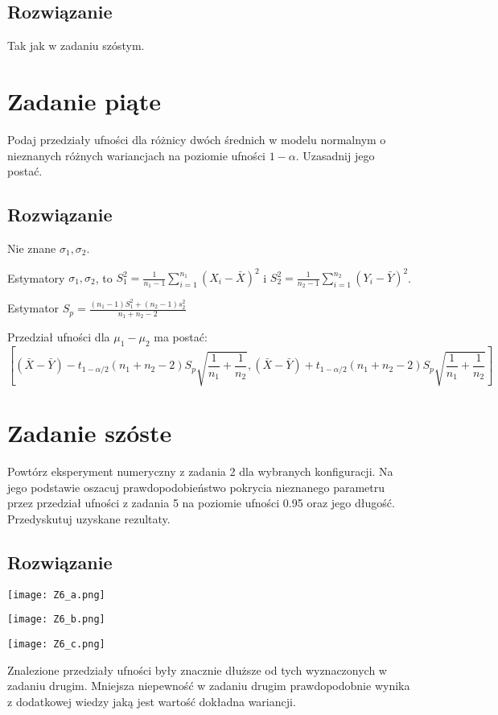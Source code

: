 \documentclass[a4paper]{article}
\begin{document}
\subsection{Rozwiązanie}
Tak jak w zadaniu szóstym.

\section{Zadanie piąte}
Podaj przedziały ufności dla różnicy dwóch średnich w modelu normalnym o nieznanych różnych wariancjach na poziomie ufności $1-\alpha$. Uzasadnij jego postać.

\subsection{Rozwiązanie}
Nie znane $\sigma_1, \sigma_2$.

Estymatory $\sigma_1, \sigma_2$, to $S_1^2=\frac{1}{n_1-1}\sum_{i=1}^{n_1}(X_i-\bar{X})^2$ i $S_2^2=\frac{1}{n_2-1}\sum_{i=1}^{n_2}(Y_i-\bar{Y})^2$.

Estymator $S_p=\frac{(n_1-1)S_1^2+(n_2-1)s_2^2}{n_1+n_2-2}$

Przedział ufności dla $\mu_1-\mu_2$ ma postać:
$$[(\bar{X}-\bar{Y})-t_{1-\alpha/2}(n_1+n_2-2)S_p\sqrt{\frac{1}{n_1}+\frac{1}{n_2}},(\bar{X}-\bar{Y})+t_{1-\alpha/2}(n_1+n_2-2)S_p\sqrt{\frac{1}{n_1}+\frac{1}{n_2}}]$$

\section{Zadanie szóste}
Powtórz eksperyment numeryczny z zadania 2 dla wybranych konfiguracji. Na jego podstawie oszacuj prawdopodobieństwo pokrycia nieznanego parametru przez przedział ufności z zadania 5 na poziomie ufności 0.95 oraz jego długość. Przedyskutuj uzyskane rezultaty.

\subsection{Rozwiązanie}

\texttt{[image: Z6\_a.png]}

\texttt{[image: Z6\_b.png]}

\texttt{[image: Z6\_c.png]}

Znalezione przedziały ufności były znacznie dłuższe od tych wyznaczonych w zadaniu drugim. Mniejsza niepewność w zadaniu drugim prawdopodobnie wynika z dodatkowej wiedzy jaką jest wartość dokładna wariancji.
\end{document}
